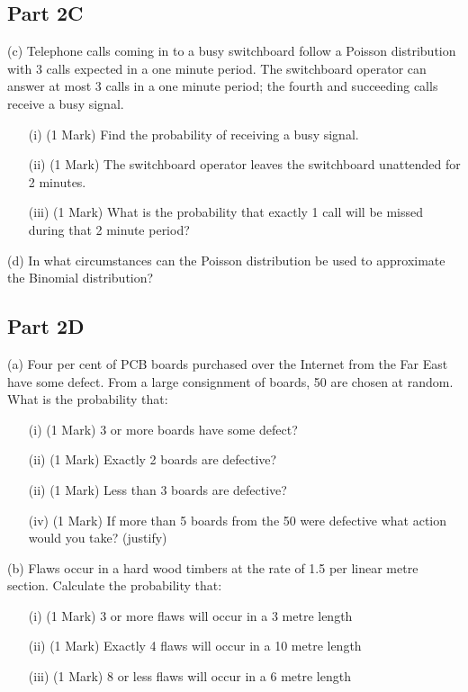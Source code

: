 \documentclass[]{article}
\begin{document}
\subsection*{Part 2C}
(c)	Telephone calls coming in to a busy switchboard follow a Poisson distribution with 3 calls expected in a one minute period.  
The switchboard operator can answer at most 3 calls in a one minute period; the fourth and succeeding calls receive a busy signal.
\begin{itemize} 
\item[(i)] (1 Mark) 	   Find the probability of receiving a busy signal.
\item[(ii)] (1 Mark) 	   The switchboard operator leaves the switchboard unattended for 2 minutes.  
\item[(iii)] (1 Mark) What is the probability that exactly 1 call will be missed during that 2 minute period?
\end{itemize}       

(d)	In what circumstances can the Poisson distribution be used to approximate the Binomial distribution?
      


\subsection*{Part 2D}


(a)  	Four  per cent of PCB boards purchased over the Internet from the Far East have some defect.  
From a large consignment of boards, 50 are chosen at random.  
What is the probability that:
\begin{itemize}
\item[(i)] (1 Mark) 	3 or more boards have some defect?
\item[(ii)] (1 Mark) 	Exactly 2 boards are defective?
\item[(ii)] (1 Mark) 	Less than 3 boards are defective?
\item[(iv)] (1 Mark) 	If more than 5 boards from the 50 were defective what action would you take? (justify)
\end{itemize} 
(b) 	Flaws occur in a hard wood timbers  at the rate of 1.5 per linear  metre section.  Calculate the probability that:
\begin{itemize}
\item[(i)] (1 Mark) 	3 or more flaws will occur in a 3  metre length 
\item[(ii)] (1 Mark) 	Exactly 4 flaws will occur in a 10 metre length
\item[(iii)] (1 Mark) 	8 or less flaws will occur in a 6  metre length 
\end{itemize} 
\end{document}
